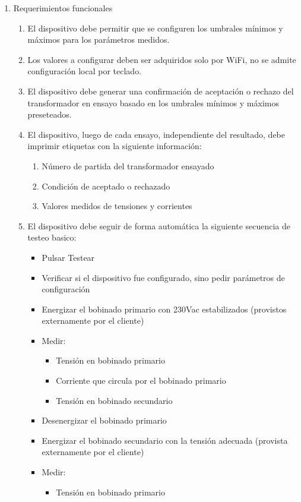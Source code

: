 \documentclass[11pt]{charter}
\begin{document}
\begin{enumerate}
\begin{enumerate}
	\end{enumerate}
\item Requerimientos funcionales
	\begin{enumerate}
	\item El dispositivo debe permitir que se configuren los umbrales mínimos y máximos para los parámetros medidos. 
	\item Los valores a configurar deben ser adquiridos solo por WiFi, no se admite configuración local por teclado.
	\item El dispositivo debe generar una confirmación de aceptación o rechazo del transformador en ensayo basado en los umbrales mínimos y máximos preseteados.
	\item El dispositivo, luego de cada ensayo, independiente del resultado, debe imprimir etiquetas con la siguiente información:
		\begin{enumerate}
		\item Número de partida del transformador ensayado
		\item Condición de aceptado o rechazado
		\item Valores medidos de tensiones y corrientes
		\end{enumerate}
	\item El dispositivo debe seguir de forma automática la siguiente secuencia de testeo basico:
		\begin{itemize}
		\item Pulsar Testear
		\item Verificar si el dispositivo fue configurado, sino pedir parámetros de configuración
		\item Energizar el bobinado primario con 230Vac estabilizados  (provistos externamente por el cliente)
		\item Medir:
			\begin{itemize}
			\item Tensión en bobinado primario
			\item Corriente que circula por el bobinado primario
			\item Tensión en bobinado secundario
			\end{itemize}
		\item Desenergizar el bobinado primario
		\item Energizar el bobinado secundario con la tensión adecuada (provista externamente por el cliente)
		\item Medir:
			\begin{itemize}
			\item Tensión en bobinado primario

\end{itemize}
\end{itemize}
\end{enumerate}
\end{enumerate}
\end{document}
